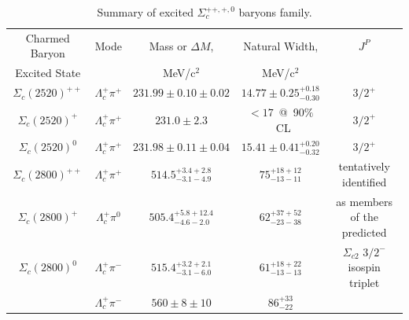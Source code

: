 \begin{table}[!htb]
\caption{Summary of excited $\Sigma_c^{++,+,0}$ baryons family.} 
 \begin{tabular}{c|c|c|c|c}
Charmed Baryon   & Mode  & Mass  or $\Delta M$, & Natural Width,  & $J^P$  \\
Excited State &  &  MeV/c$^2$ & MeV/c$^2$  \\
\hline
$\Sigma_c(2520)^{++}$ &$\Lambda_c^+\pi^+$  & $231.99\pm 0.10\pm 0.02$ & $14.77\pm 0.25^{+0.18}_{-0.30}$ & $3/2^+$   \\
$\Sigma_c(2520)^{+}$ &$\Lambda_c^+\pi^+$  & $231.0\pm 2.3$ & $<17$~@~90$\%$~CL & $3/2^+$ \\
$\Sigma_c(2520)^{0}$ &$\Lambda_c^+\pi^+$  & $231.98\pm 0.11\pm 0.04$ & $15.41\pm 0.41^{+0.20}_{-0.32}$ & $3/2^+$    \\
\hline
$\Sigma_c(2800)^{++}$ & $\Lambda_c^+\pi^{+}$ & $514.5^{+3.4+2.8}_{-3.1-4.9}$ & $75^{+18+12}_{-13-11}$ & tentatively identified      \\
$\Sigma_c(2800)^{+}$ & $\Lambda_c^+\pi^{0}$&$505.4^{+5.8+12.4}_{-4.6-2.0}$ &$62^{+37+52}_{-23-38}$ & as members of the predicted  \\
$\Sigma_c(2800)^{0}$ & $\Lambda_c^+\pi^{-}$&$515.4^{+3.2+2.1}_{-3.1-6.0}$ & $61^{+18+22}_{-13-13}$ &$\Sigma_{c2}$ $3/2^-$ isospin triplet  \\
 & $\Lambda_c^+\pi^{-}$ & $560\pm 8\pm 10$ & $86^{+33}_{-22}$  \\


\end{tabular}
\label{sumtable2} 
\end{table}

